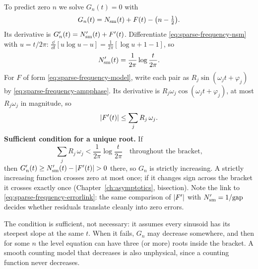 To predict zero $n$ we solve $G_n(t)=0$ with
\begin{equation}
G_n(t)=N_{\mathrm{sm}}(t)+F(t)-\bigl(n-\tfrac12\bigr).
\end{equation}
Its derivative is $G_n'(t)=N_{\mathrm{sm}}'(t)+F'(t)$. Differentiate \eqref{eq:sparse-frequency-nsm} with $u=t/2\pi$: $\frac{\dd}{\dd t}[u\log u-u]=\frac{1}{2\pi}[\log u+1-1]$, so
\begin{equation}
N_{\mathrm{sm}}'(t)=\frac{1}{2\pi}\log\frac{t}{2\pi}.
\label{eq:sparse-frequency-dnsm}
\end{equation}
For $F$ of form \eqref{eq:sparse-frequency-model}, write each pair as $R_j\sin(\omega_jt+\varphi_j)$ by \eqref{eq:sparse-frequency-ampphase}. Its derivative is $R_j\omega_j\cos(\omega_jt+\varphi_j)$, at most $R_j\omega_j$ in magnitude, so
\begin{equation}
\left\lvert F'(t)\right\rvert\le\sum_jR_j\,\omega_j .
\label{eq:sparse-frequency-slope}
\end{equation}
\textbf{Sufficient condition for a unique root.} If
\begin{equation}
\sum_jR_j\,\omega_j<\frac{1}{2\pi}\log\frac{t}{2\pi}\quad\text{throughout the bracket,}
\label{eq:sparse-frequency-monotone}
\end{equation}
then $G_n'(t)\ge N_{\mathrm{sm}}'(t)-\left\lvert F'(t)\right\rvert>0$ there, so $G_n$ is strictly increasing. A strictly increasing function crosses zero at most once; if it changes sign across the bracket it crosses exactly once (Chapter~\ref{ch:asymptotics}, bisection). Note the link to \eqref{eq:sparse-frequency-errorlink}: the same comparison of $\left\lvert F'\right\rvert$ with $N_{\mathrm{sm}}'=1/\mathrm{gap}$ decides whether residuals translate cleanly into zero errors.

The condition is sufficient, not necessary: it assumes every sinusoid has its steepest slope at the same $t$. When it fails, $G_n$ may decrease somewhere, and then for some $n$ the level equation can have three (or more) roots inside the bracket. A smooth counting model that decreases is also unphysical, since a counting function never decreases.

